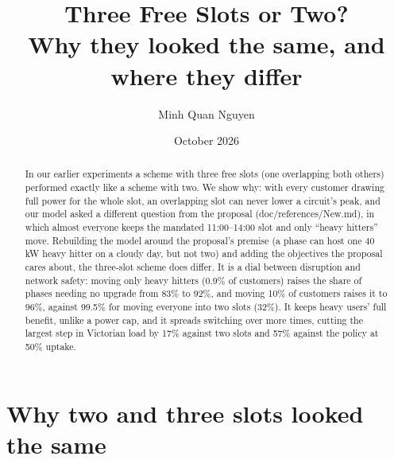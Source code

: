 \documentclass[11pt,a4paper]{article}
\title{Three Free Slots or Two?\\\large Why they looked the same, and where they differ}
\author{Minh Quan Nguyen}
\date{October 2026}
\begin{document}
\maketitle

\begin{abstract}
In our earlier experiments a scheme with three free slots (one overlapping both others) performed exactly
like a scheme with two. We show why: with every customer drawing full power for the whole slot, an
overlapping slot can never lower a circuit's peak, and our model asked a different question from the
proposal (doc/references/New.md), in which almost everyone keeps the mandated 11:00--14:00 slot and only
``heavy hitters'' move. Rebuilding the model around the proposal's premise (a phase can host one 40 kW
heavy hitter on a cloudy day, but not two) and adding the objectives the proposal cares about, the
three-slot scheme does differ. It is a dial between disruption and network safety: moving only heavy
hitters (0.9\% of customers) raises the share of phases needing no upgrade from 83\% to 92\%, and moving
10\% of customers raises it to 96\%, against 99.5\% for moving everyone into two slots (32\%). It keeps
heavy users' full benefit, unlike a power cap, and it spreads switching over more times, cutting the
largest step in Victorian load by 17\% against two slots and 57\% against the policy at 50\% uptake.
\end{abstract}

\section{Why two and three slots looked the same}
\end{document}
